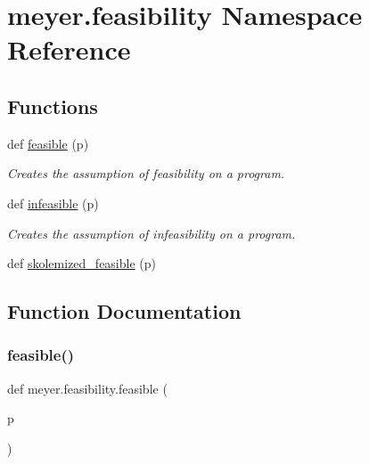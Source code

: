 \hypertarget{namespacemeyer_1_1feasibility}{}\section{meyer.\+feasibility Namespace Reference}
\label{namespacemeyer_1_1feasibility}
\subsection*{Functions}
\begin{DoxyCompactItemize}
\item 
def \hyperlink{namespacemeyer_1_1feasibility_a784d705bc651829bdb0857446104635a}{feasible} (p)
\begin{DoxyCompactList}\small\item\em Creates the assumption of feasibility on a program. \end{DoxyCompactList}\item 
def \hyperlink{namespacemeyer_1_1feasibility_a57a2c6e0b6e8f997f27de597de0aba79}{infeasible} (p)
\begin{DoxyCompactList}\small\item\em Creates the assumption of infeasibility on a program. \end{DoxyCompactList}\item 
def \hyperlink{namespacemeyer_1_1feasibility_a60f0122f899a01e6c5b69f43d7f29727}{skolemized\+\_\+feasible} (p)
\end{DoxyCompactItemize}


\subsection{Function Documentation}
\mbox{\label{namespacemeyer_1_1feasibility_a784d705bc651829bdb0857446104635a}} 
\subsubsection{\texorpdfstring{feasible()}{feasible()}}
{\footnotesize\ttfamily def meyer.\+feasibility.\+feasible (\begin{DoxyParamCaption}\item[{}]{p }\end{DoxyParamCaption})}



